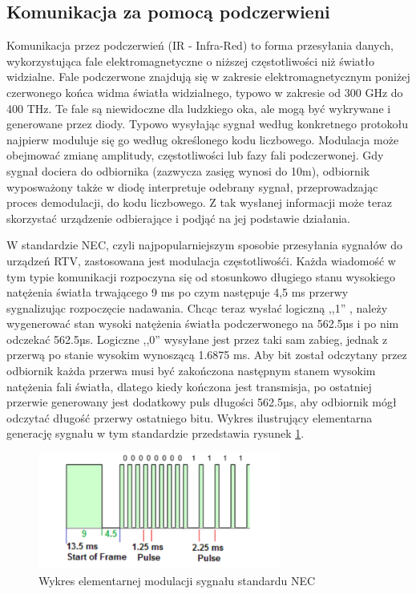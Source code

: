 \documentclass[12pt,twoside]{article}
\begin{document}
\subsection{Komunikacja za pomocą podczerwieni}
Komunikacja przez podczerwień (IR - Infra-Red) to forma przesyłania danych, wykorzystująca fale elektromagnetyczne
o niższej częstotliwości niż światło widzialne. Fale podczerwone znajdują się w zakresie elektromagnetycznym
poniżej czerwonego końca widma światła widzialnego, typowo w zakresie od 300 GHz do 400 THz. Te fale są
niewidoczne dla ludzkiego oka, ale mogą być wykrywane i generowane przez diody. Typowo
wysyłając sygnał według konkretnego protokołu najpierw moduluje się go według określonego kodu liczbowego.
Modulacja może obejmować zmianę amplitudy, częstotliwości lub fazy fali podczerwonej. Gdy sygnał dociera do odbiornika
(zazwycza zasięg wynosi do 10m), odbiornik wyposważony także w diodę interpretuje odebrany sygnał, przeprowadzając proces demodulacji, do kodu
liczbowego. Z tak wysłanej informacji może teraz skorzystać urządzenie odbierające i podjąć na jej podstawie działania.

W standardzie NEC, czyli najpopularniejszym sposobie przesyłania sygnałów do urządzeń RTV, zastosowana jest modulacja częstotliwośći. Każda wiadomość w tym typie komunikacji rozpoczyna się od stosunkowo długiego stanu wysokiego natężenia światła trwającego 9 ms po czym następuje 4,5 ms przerwy sygnalizując rozpoczęcie nadawania. Chcąc teraz wysłać logiczną ,,1'' , należy wygenerować stan wysoki natężenia światła podczerwonego na 562.5µs i po nim odczekać 562.5µs. Logiczne ,,0'' wysyłane jest przez taki sam zabieg, jednak z przerwą po stanie wysokim wynoszącą 1.6875 ms. Aby bit został odczytany przez odbiornik każda przerwa musi być zakończona następnym stanem wysokim natężenia fali światła, dlatego kiedy kończona jest transmisja, po ostatniej przerwie generowany jest dodatkowy puls długości 562.5µs, aby odbiornik mógł odczytać długość przerwy ostatniego bitu. Wykres ilustrujący elementarna generację sygnału w tym standardzie przedstawia rysunek \ref*{Fig:necOnesZerosFigure}.
\begin{figure}[ht]
   \centering
   \includegraphics[width=8cm]{images/necOnesAndZeros.png}
   \caption{Wykres elementarnej modulacji sygnału standardu NEC\cite{necIR}}
   \label{Fig:necOnesZerosFigure}
\end{figure}
\end{document}

